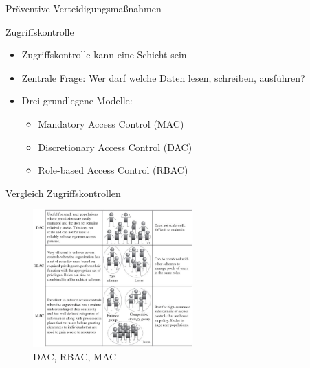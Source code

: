 \begin{frame}{Präventive Verteidigungsmaßnahmen}
  \begin{block}{Zugriffskontrolle}
    \begin{itemize}[<+->]
      \item Zugriffskontrolle kann eine Schicht sein
      \item Zentrale Frage: Wer darf welche Daten lesen, schreiben, ausführen?
      \item Drei grundlegene Modelle:
      \begin{itemize}[<+->]
        \item Mandatory Access Control (MAC)
        \item Discretionary Access Control (DAC)
        \item Role-based Access Control (RBAC)
      \end{itemize}
    \end{itemize}
  \end{block}
\end{frame}

\begin{frame}{Vergleich Zugriffskontrollen}
  \begin{figure}
    \centering
    \includegraphics[width=0.55\textwidth]{assets/access_control}
    \caption{DAC, RBAC, MAC \footnotemark}
  \end{figure}

\end{frame}

